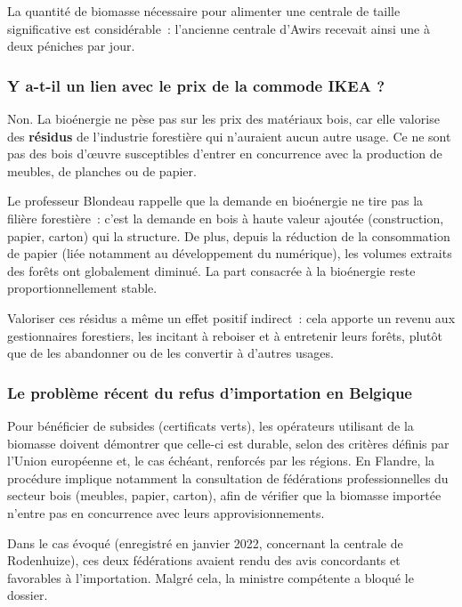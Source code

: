La quantité de biomasse nécessaire pour alimenter une centrale de taille significative est considérable~: l'ancienne centrale d'Awirs recevait ainsi une à deux péniches par jour.

\subsubsection{Y a-t-il un lien avec le prix de la commode IKEA ?}

Non. La bioénergie ne pèse pas sur les prix des matériaux bois, car elle valorise des \textbf{résidus} de l'industrie forestière qui n'auraient aucun autre usage. Ce ne sont pas des bois d'œuvre susceptibles d'entrer en concurrence avec la production de meubles, de planches ou de papier.

Le professeur Blondeau rappelle que la demande en bioénergie ne tire pas la filière forestière~: c'est la demande en bois à haute valeur ajoutée (construction, papier, carton) qui la structure. De plus, depuis la réduction de la consommation de papier (liée notamment au développement du numérique), les volumes extraits des forêts ont globalement diminué. La part consacrée à la bioénergie reste proportionnellement stable.

Valoriser ces résidus a même un effet positif indirect~: cela apporte un revenu aux gestionnaires forestiers, les incitant à reboiser et à entretenir leurs forêts, plutôt que de les abandonner ou de les convertir à d'autres usages.

\subsubsection{Le problème récent du refus d'importation en Belgique}

Pour bénéficier de subsides (certificats verts), les opérateurs utilisant de la biomasse doivent démontrer que celle-ci est durable, selon des critères définis par l'Union européenne et, le cas échéant, renforcés par les régions. En Flandre, la procédure implique notamment la consultation de fédérations professionnelles du secteur bois (meubles, papier, carton), afin de vérifier que la biomasse importée n'entre pas en concurrence avec leurs approvisionnements.

Dans le cas évoqué (enregistré en janvier 2022, concernant la centrale de Rodenhuize), ces deux fédérations avaient rendu des avis concordants et favorables à l'importation. Malgré cela, la ministre compétente a bloqué le dossier.

